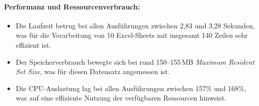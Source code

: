 \documentclass[11pt,a4paper]{article}
\begin{document}
\begin{table}[h]
    \centering
    \caption{Ergebnisse von Testfall 2}
    \label{tab:auswertung_testfall2}
\end{table}

\paragraph{Performanz und Ressourcenverbrauch:}
\begin{itemize}
    \item Die Laufzeit betrug bei allen Ausführungen zwischen 2,83 und 3,28 Sekunden, was für die Verarbeitung von 10 Excel-Sheets mit insgesamt 140 Zeilen sehr effizient ist.
    \item Der Speicherverbrauch bewegte sich bei rund 150--155\,MB \emph{Maximum Resident Set Size}, was für diesen Datensatz angemessen ist.
    \item Die CPU-Auslastung lag bei allen Ausführungen zwischen 157\% und 168\%, was auf eine effiziente Nutzung der verfügbaren Ressourcen hinweist.
\end{itemize}
\end{document}

